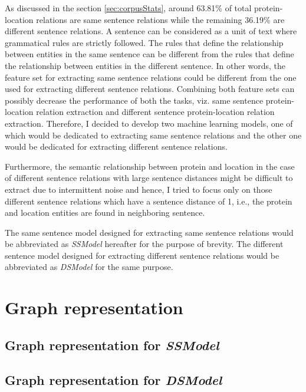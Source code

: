 As discussed in the section \ref{sec:corpusStats}, around 63.81\% of total protein-location relations are same sentence relations while the remaining 36.19\% are different sentence relations. A sentence can be considered as a unit of text where grammatical rules are strictly followed. The rules that define the relationship between entities in the same sentence can be different from the rules that define the relationship between entities in the different sentence. In other words, the feature set for extracting same sentence relations could be different from the one used for extracting different sentence relations. Combining both feature sets can possibly decrease the performance of both the tasks, viz. same sentence protein-location relation extraction and different sentence protein-location relation extraction. Therefore, I decided to develop two machine learning models, one of which would be dedicated to extracting same sentence relations and the other one would be dedicated for extracting different sentence relations.

Furthermore, the semantic relationship between protein and location in the case of different sentence relations with large sentence distances might be difficult to extract due to intermittent noise and hence, I tried to focus only on those different sentence relations which have a sentence distance of 1, i.e., the protein and location entities are found in neighboring sentence.

The same sentence model designed for extracting same sentence relations would be  abbreviated as \textit{SSModel} hereafter for the purpose of brevity. The different sentence model designed for extracting different sentence relations would be abbreviated as \textit{DSModel} for the same purpose.

\section{Graph representation} \label{sec:graphRep}

\subsection{Graph representation for \textit{SSModel}}\label{sec:graphSSModel}

\subsection{Graph representation for \textit{DSModel}}\label{sec:graphDSModel}


